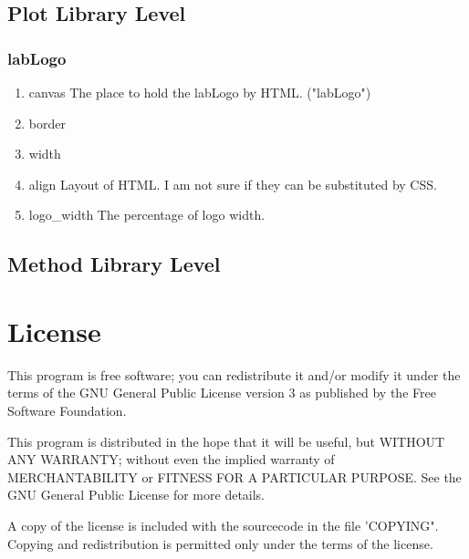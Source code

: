 \documentclass{article}
\begin{document}
\subsection{Plot Library Level}
\subsubsection{labLogo}
\begin{enumerate}
\item canvas
The place to hold the labLogo by HTML.
("labLogo")

\item border
\item width
\item align
Layout of HTML.
I am not sure if they can be substituted by CSS.

\item logo\_width
The percentage of logo width.
\end{enumerate}

\subsection{Method Library Level}

\section{License}
This program is free software; you can redistribute it and/or modify it under the terms of the GNU General Public License version 3 as published by the Free Software Foundation.

This program is distributed in the hope that it will be useful, but WITHOUT ANY WARRANTY; without even the implied warranty of MERCHANTABILITY or FITNESS FOR A PARTICULAR PURPOSE. See the GNU General Public License for more details.

A copy of the license is included with the sourcecode in the file 'COPYING". Copying and redistribution is permitted only under the terms of the license.



\end{document}
